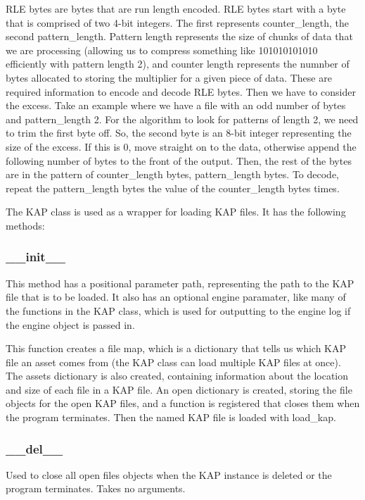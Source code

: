 \documentclass{report}
\begin{document}
RLE bytes are bytes that are run length encoded. RLE bytes start with a byte that is comprised of two 4-bit integers. The first represents counter\_length, the second pattern\_length. Pattern length represents the size of chunks of data that we are processing (allowing us to compress something like 101010101010 efficiently with pattern length 2), and counter length represents the numnber of bytes allocated to storing the multiplier for a given piece of data. These are required information to encode and decode RLE bytes. Then we have to consider the excess. Take an example where we have a file with an odd number of bytes and pattern\_length 2. For the algorithm to look for patterns of length 2, we need to trim the first byte off. So, the second byte is an 8-bit integer representing the size of the excess. If this is 0, move straight on to the data, otherwise append the following number of bytes to the front of the output. Then, the rest of the bytes are in the pattern of counter\_length bytes, pattern\_length bytes. To decode, repeat the pattern\_length bytes the value of the counter\_length bytes times.

The KAP class is used as a wrapper for loading KAP files. It has the following methods:

\subsubsection{\_\_init\_\_}

This method has a positional parameter path, representing the path to the KAP file that is to be loaded. It also has an optional engine paramater, like many of the functions in the KAP class, which is used for outputting to the engine log if the engine object is passed in.

This function creates a file map, which is a dictionary that tells us which KAP file an asset comes from (the KAP class can load multiple KAP files at once). The assets dictionary is also created, containing information about the location and size of each file in a KAP file. An open dictionary is created, storing the file objects for the open KAP files, and a function is registered that closes them when the program terminates. Then the named KAP file is loaded with load\_kap.

\subsubsection{\_\_del\_\_}

Used to close all open files objects when the KAP instance is deleted or the program terminates. Takes no arguments.
\end{document}
